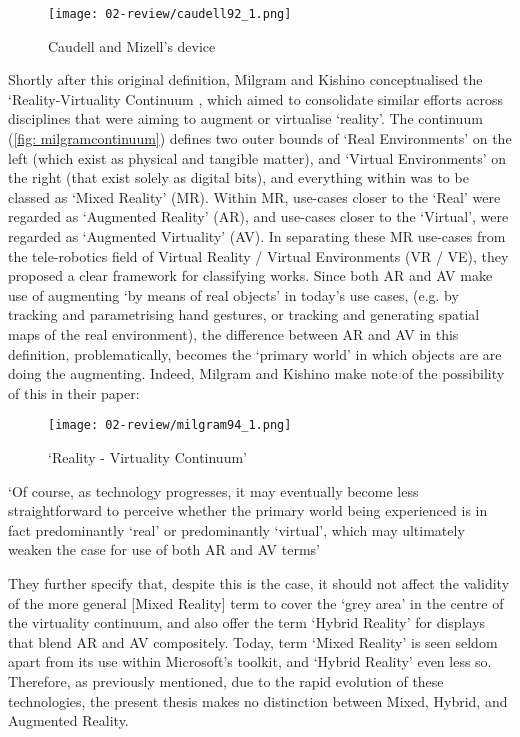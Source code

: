 \begin{figure}[bth]
    \myfloatalign
    {\texttt{[image: 02-review/caudell92\_1.png]}}
    \caption[Caudell and Mizell's device]{Caudell and Mizell's device}\label{fig: caudellprivateeye}
\end{figure}

Shortly after this original definition, Milgram and Kishino conceptualised the `Reality-Virtuality Continuum \citeyearpar{milgram1994}, which aimed to consolidate similar efforts across disciplines that were aiming to augment or virtualise `reality'. The continuum (\autoref{fig: milgramcontinuum}) defines two outer bounds of `Real Environments' on the left (which exist as physical and tangible matter), and `Virtual Environments' on the right (that exist solely as digital bits), and everything within was to be classed as `Mixed Reality' (MR). Within MR, use-cases closer to the `Real' were regarded as `Augmented Reality' (AR), and use-cases closer to the `Virtual', were regarded as `Augmented Virtuality' (AV). In separating these MR use-cases from the tele-robotics field of Virtual Reality / Virtual Environments (VR / VE), they proposed a clear framework for classifying works. Since both AR and AV make use of augmenting `by means of real objects' in today's use cases, (e.g. by tracking and parametrising hand gestures, or tracking and generating spatial maps of the real environment), the difference between AR and AV in this definition, problematically, becomes the `primary world' in which objects are are doing the augmenting. Indeed, Milgram and Kishino make note of the possibility of this in their paper: 

\begin{figure}[bth]
    \myfloatalign
    {\texttt{[image: 02-review/milgram94\_1.png]}}
    \caption[`Reality - Virtuality Continuum']{`Reality - Virtuality Continuum'}\label{fig: milgramcontinuum}
\end{figure}

`Of course, as technology progresses, it may eventually become less straightforward to perceive whether the primary world being experienced is in fact predominantly `real' or predominantly `virtual', which may ultimately weaken the case for use of both AR and AV terms'

They further specify that, despite this is the case, it should not affect the validity of the more general [Mixed Reality] term to cover the `grey area' in the centre of the virtuality continuum, and also offer the term `Hybrid Reality' for displays that blend AR and AV compositely. Today, term `Mixed Reality' is seen seldom apart from its use within Microsoft's toolkit, and `Hybrid Reality' even less so. Therefore, as previously mentioned, due to the rapid evolution of these technologies, the present thesis makes no distinction between Mixed, Hybrid, and Augmented Reality.

